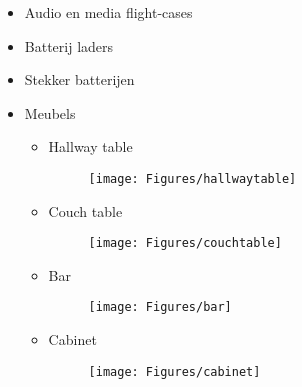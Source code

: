 \documentclass[a4paper,10pt]{article}
\numberwithin{equation}{section}
\numberwithin{figure}{section}
\numberwithin{table}{section}
\begin{document}
\begin{itemize}
	\item Audio en media flight-cases
	\item Batterij laders
	\item Stekker batterijen
	\item Meubels
		\begin{itemize}
			\item Hallway table
			
				\begin{figure}[H]
					\centering
					\texttt{[image: Figures/hallwaytable]}
				\end{figure}
			
			\item Couch table
				\begin{figure}[H]
					\centering
					\texttt{[image: Figures/couchtable]}
				\end{figure}			
			
			\item Bar
				\begin{figure}[H]
					\centering
					\texttt{[image: Figures/bar]}
				\end{figure}			
			
			\item Cabinet
					\begin{figure}[H]
						\centering
						\texttt{[image: Figures/cabinet]}
					\end{figure}	
			

\end{itemize}
\end{itemize}
\end{document}
